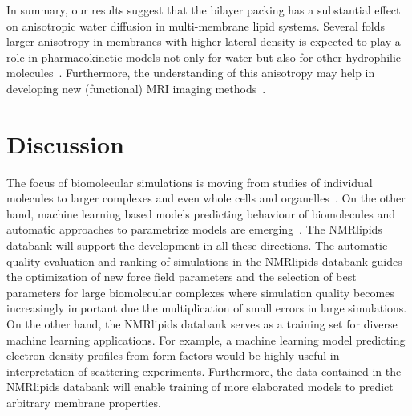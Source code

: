 \documentclass[fleqn,10pt]{wlscirep}
\begin{document}
In summary, our results suggest that the bilayer packing has a substantial effect on anisotropic water diffusion in multi-membrane lipid systems. Several folds larger anisotropy in membranes with higher lateral density is expected to play a role in pharmacokinetic models not only for water but also for other hydrophilic molecules~\cite{nitsche19}. Furthermore, the understanding of this anisotropy may help in developing new (functional) MRI imaging methods~\cite{topgaard20}.

\section{Discussion}


The focus of biomolecular simulations is moving from studies of individual molecules to larger complexes and even whole cells and organelles~\cite{johnson15,thornburg22,gupta22}. On the other hand, machine learning based models predicting behaviour of biomolecules and automatic approaches to parametrize models are emerging~\cite{jumper21,antila22b}. The NMRlipids databank will support the development in all these directions. The automatic quality evaluation and ranking of simulations in the NMRlipids databank guides the optimization of new force field parameters and the selection of best parameters for large biomolecular complexes where simulation quality becomes increasingly important due the multiplication of small errors in large simulations. On the other hand, the NMRlipids databank serves as a training set for diverse machine learning applications. 
For example, a machine learning model predicting electron density profiles from form factors would be highly useful in interpretation of scattering experiments. Furthermore, the data contained in the NMRlipids databank will enable training of more elaborated models to predict arbitrary membrane properties. 
\end{document}
